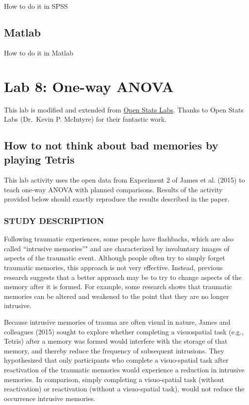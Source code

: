 \documentclass[]{book}
\theoremstyle{definition}
\theoremstyle{definition}
\theoremstyle{definition}
\theoremstyle{remark}
\begin{document}
How to do it in SPSS

\section{Matlab}\label{matlab-6}

How to do it in Matlab

\chapter{Lab 8: One-way ANOVA}\label{lab-8-one-way-anova}

This lab is modified and extended from
\href{https://sites.trinity.edu/osl}{Open Stats Labs}. Thanks to Open
Stats Labs (Dr.~Kevin P. McIntyre) for their fantastic work.

\section{How to not think about bad memories by playing
Tetris}\label{how-to-not-think-about-bad-memories-by-playing-tetris}

This lab activity uses the open data from Experiment 2 of James et al.
(2015) to teach one-way ANOVA with planned comparisons. Results of the
activity provided below should exactly reproduce the results described
in the paper.

\subsection{STUDY DESCRIPTION}\label{study-description-2}

Following traumatic experiences, some people have flashbacks, which are
also called ``intrusive memories''" and are characterized by involuntary
images of aspects of the traumatic event. Although people often try to
simply forget traumatic memories, this approach is not very effective.
Instead, previous research suggests that a better approach may be to try
to change aspects of the memory after it is formed. For example, some
research shows that traumatic memories can be altered and weakened to
the point that they are no longer intrusive.

Because intrusive memories of trauma are often visual in nature, James
and colleagues (2015) sought to explore whether completing a
visuospatial task (e.g., Tetris) after a memory was formed would
interfere with the storage of that memory, and thereby reduce the
frequency of subsequent intrusions. They hypothesized that only
participants who complete a visuo-spatial task after reactivation of the
traumatic memories would experience a reduction in intrusive memories.
In comparison, simply completing a visuo-spatial task (without
reactivation) or reactivation (without a visuo-spatial task), would not
reduce the occurrence intrusive memories.
\end{document}
